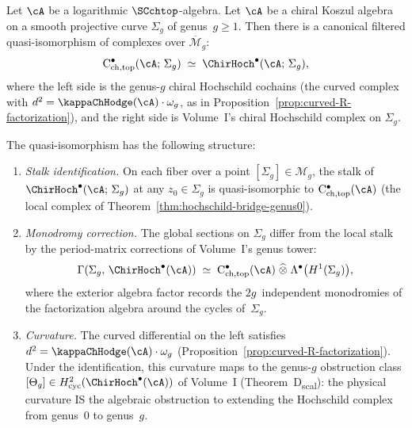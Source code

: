 \begin{theorem}
\label{thm:hochschild-bridge-higher-genus}
Let\/ $\cA$ be a logarithmic\/ $\SCchtop$-algebra. Let $\cA$ be a chiral Koszul algebra
on a smooth projective curve $\Sigma_g$ of genus~$g \geq 1$.
Then there is a canonical filtered quasi-isomorphism of complexes
over $\overline{\mathcal{M}}_g$:
\begin{equation}\label{eq:hochschild-bridge-genus-g}
\mathrm{C}^\bullet_{\mathrm{ch,top}}(\cA;\, \Sigma_g)
\;\simeq\;
\ChirHoch^\bullet(\cA;\, \Sigma_g),
\end{equation}
where the left side is the genus-$g$ chiral Hochschild cochains
(the curved complex with $d^2 = \kappaChHodge(\cA) \cdot \omega_g$, as
in Proposition~\textup{\ref{prop:curved-R-factorization}}), and
the right side is Volume~I's chiral Hochschild complex on
$\Sigma_g$.

The quasi-isomorphism has the following structure:
\begin{enumerate}[label=\textup{(\roman*)}]
\item \emph{Stalk identification.}
 On each fiber over a point $[\Sigma_g] \in \mathcal{M}_g$,
 the stalk of $\ChirHoch^\bullet(\cA;\, \Sigma_g)$ at any
 $z_0 \in \Sigma_g$ is quasi-isomorphic to
 $\mathrm{C}^\bullet_{\mathrm{ch,top}}(\cA)$ (the local
 complex of Theorem~\textup{\ref{thm:hochschild-bridge-genus0}}).

\item \emph{Monodromy correction.}
 The global sections on $\Sigma_g$ differ from the local stalk
 by the period-matrix corrections of Volume~I's genus tower:
 \[
 \Gamma(\Sigma_g,\, \ChirHoch^\bullet(\cA))
 \;\simeq\;
 \mathrm{C}^\bullet_{\mathrm{ch,top}}(\cA)
 \;\widehat\otimes\;
 \Lambda^\bullet\bigl(H^1(\Sigma_g)\bigr),
 \]
 where the exterior algebra factor records the
 $2g$~independent monodromies of the factorization algebra
 around the cycles of~$\Sigma_g$.

\item \emph{Curvature.}
 The curved differential on the left satisfies
 $d^2 = \kappaChHodge(\cA) \cdot \omega_g$
 (Proposition~\textup{\ref{prop:curved-R-factorization}}).
 Under the identification, this curvature maps to the
 genus-$g$ obstruction class $[\Theta_g] \in
 H^2_{\mathrm{cyc}}(\ChirHoch^\bullet(\cA))$ of Volume~I
 (Theorem~D\textsubscript{scal}): the physical curvature IS the
 algebraic obstruction to extending the Hochschild complex
 from genus~$0$ to genus~$g$.


\end{enumerate}
\end{theorem}
